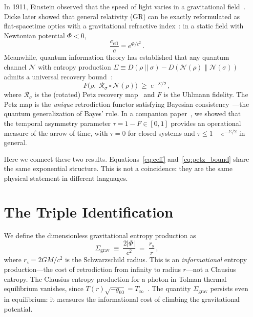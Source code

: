 \documentclass[prl,twocolumn,superscriptaddress,floatfix,nofootinbib]{revtex4-2}
\newcommand{\Petz}{\mathcal{R}}
\newcommand{\chan}{\mathcal{N}}
\newcommand{\tauasym}{\tau}
\newcommand{\ceff}{c_{\mathrm{eff}}}
\newcommand{\rs}{r_{\mathrm{s}}}
\newcommand{\Sgrav}{\Sigma_{\mathrm{grav}}}
\begin{document}
In 1911, Einstein observed that the speed of light varies in a
gravitational field~\cite{Einstein1911}.
Dicke later showed that general relativity (GR) can be exactly
reformulated as flat-spacetime optics with a gravitational
refractive index~\cite{Dicke1957}:
in a static field with Newtonian potential $\Phi < 0$,
\begin{equation}
  \frac{\ceff}{c} = e^{\Phi/c^2}\,.
  \label{eq:ceff}
\end{equation}
Meanwhile, quantum information theory has established that
any quantum channel $\chan$ with entropy production
$\Sigma \equiv D(\rho\|\sigma) - D(\chan(\rho)\|\chan(\sigma))$
admits a universal recovery bound~\cite{Petz1988,JRSWW2018}:
\begin{equation}
  F\!\bigl(\rho,\;\Petz_\sigma \circ \chan(\rho)\bigr)
  \;\geq\; e^{-\Sigma/2}\,,
  \label{eq:petz_bound}
\end{equation}
where $\Petz_\sigma$ is the (rotated) Petz recovery
map~\cite{Petz1988} and $F$ is the Uhlmann fidelity.
The Petz map is the \emph{unique} retrodiction functor
satisfying Bayesian consistency~\cite{Parzygnat2023}---the
quantum generalization of Bayes' rule.
In a companion paper~\cite{Huang2026}, we showed that the temporal
asymmetry parameter $\tauasym = 1 - F \in [0,1]$ provides an
operational measure of the arrow of time, with
$\tauasym = 0$ for closed systems and
$\tauasym \leq 1 - e^{-\Sigma/2}$ in general.

Here we connect these two results.
Equations~\eqref{eq:ceff} and~\eqref{eq:petz_bound} share the same
exponential structure. This is not a coincidence: they are the same
physical statement in different languages.

\section{The Triple Identification}
\label{sec:identification}

We define the dimensionless gravitational entropy
production as
\begin{equation}
  \Sgrav \;\equiv\; \frac{2|\Phi|}{c^2}
  \;=\; \frac{\rs}{r}\,,
  \label{eq:Sgrav}
\end{equation}
where $\rs = 2GM/c^2$ is the Schwarzschild radius.
This is an \emph{informational} entropy production---the
cost of retrodiction from infinity to radius $r$---not a
Clausius entropy. The Clausius entropy production for a
photon in Tolman thermal equilibrium vanishes, since
$T(r)\sqrt{-g_{00}} = T_\infty$~\cite{Tolman1930}. The
quantity $\Sgrav$ persists even in equilibrium: it measures
the informational cost of climbing the gravitational
potential.
\end{document}
